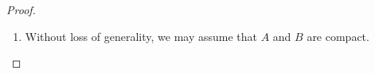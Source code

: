 \begin{proof}
\begin{enumerate}

        \item Without loss of generality, we may assume that \(A\) and \(B\) are compact.


\end{enumerate}
\end{proof}
